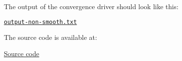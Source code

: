 \highspace
The output of the convergence driver should look like this: 
\begin{center}
    \href{https://gist.github.com/AndreVale69/08f1b087ab991b1bc70fdd99b77f02dd#file-output-non-smooth-txt}{\texttt{output-non-smooth.txt}}
    \hspace{1em}
\end{center}

\noindent
The source code is available at:
\begin{center}
    \href{https://gist.github.com/AndreVale69/08f1b087ab991b1bc70fdd99b77f02dd}{Source code}
    \hspace{1em}
\end{center}